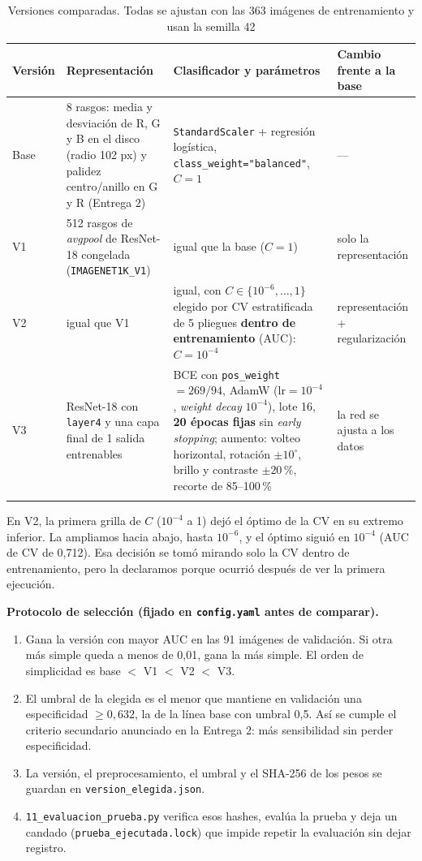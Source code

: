 \documentclass[pdflatex,sn-mathphys-num]{sn-jnl}%
\theoremstyle{thmstyleone}%
\theoremstyle{thmstyletwo}%
\theoremstyle{thmstylethree}%
\begin{document}
\begin{table}[htbp]
\small
\caption{Versiones comparadas. Todas se ajustan con las 363 imágenes de entrenamiento y usan la semilla 42}\label{tab:versiones}
\begin{tabularx}{\textwidth}{@{}L{1.1cm}L{4.4cm}YL{3.4cm}@{}}
\toprule
Versión & Representación & Clasificador y parámetros & Cambio frente a la base \\
\midrule
Base & 8 rasgos: media y desviación de R, G y B en el disco (radio 102 px) y palidez centro/anillo en G y R (Entrega 2) & \texttt{StandardScaler} + regresión logística, \texttt{class\_weight="balanced"}, $C=1$ & --- \\
\addlinespace
V1 & 512 rasgos de \textit{avgpool} de ResNet-18 congelada (\texttt{IMAGENET1K\_V1}) & igual que la base ($C=1$) & solo la representación \\
\addlinespace
V2 & igual que V1 & igual, con $C\in\{10^{-6},\dots,1\}$ elegido por CV estratificada de 5 pliegues \textbf{dentro de entrenamiento} (AUC): $C=10^{-4}$ & representación + regularización \\
\addlinespace
V3 & ResNet-18 con \texttt{layer4} y una capa final de 1 salida entrenables & BCE con \texttt{pos\_weight} $=269/94$, AdamW \cite{loshchilov2019adamw} ($\text{lr}=10^{-4}$, \textit{weight decay} $10^{-4}$), lote 16, \textbf{20 épocas fijas} sin \textit{early stopping}; aumento: volteo horizontal, rotación $\pm10^\circ$, brillo y contraste $\pm20\,\%$, recorte de 85--100\,\% & la red se ajusta a los datos \\
\botrule
\end{tabularx}
\end{table}

En V2, la primera grilla de $C$ ($10^{-4}$ a 1) dejó el óptimo de la CV en su extremo inferior. La ampliamos hacia abajo, hasta $10^{-6}$, y el óptimo siguió en $10^{-4}$ (AUC de CV de 0,712). Esa decisión se tomó mirando solo la CV dentro de entrenamiento, pero la declaramos porque ocurrió después de ver la primera ejecución.

\textbf{Protocolo de selección (fijado en \texttt{config.yaml} antes de comparar).}
\begin{enumerate}\raggedright
\item Gana la versión con mayor AUC en las 91 imágenes de validación. Si otra más simple queda a menos de 0,01, gana la más simple. El orden de simplicidad es base $<$ V1 $<$ V2 $<$ V3.
\item El umbral de la elegida es el menor que mantiene en validación una especificidad $\ge 0{,}632$, la de la línea base con umbral 0,5. Así se cumple el criterio secundario anunciado en la Entrega 2: más sensibilidad sin perder especificidad.
\item La versión, el preprocesamiento, el umbral y el SHA-256 de los pesos se guardan en \texttt{version\_elegida.json}.
\item \texttt{11\_evaluacion\_prueba.py} verifica esos hashes, evalúa la prueba y deja un candado (\texttt{prueba\_ejecutada.lock}) que impide repetir la evaluación sin dejar registro.
\end{enumerate}
\end{document}
